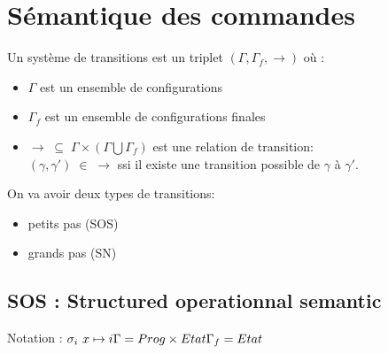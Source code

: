 \documentclass[10pt,a4paper]{article}
\begin{document}
\section{Sémantique des commandes}

\begin{definition} Un système de transitions est un triplet $(\Gamma, \Gamma_f, \rightarrow )$ où :\begin{itemize}
\item $\Gamma$ est un ensemble de configurations
\item $\Gamma_f$ est un ensemble de configurations finales
\item $\rightarrow \; \subseteq \; \Gamma \times (\Gamma \bigcup \Gamma_f )$ est une relation de transition: \\
$(\gamma, \gamma' )\; \in \;\rightarrow$ ssi il existe une transition possible de $\gamma$ à $\gamma'$.
\end{itemize}
\end{definition}

On va avoir deux types de transitions: \begin{itemize}
\item petits pas (SOS)
\item grands pas (SN)
\end{itemize}

\subsection{SOS : Structured operationnal semantic}
\noindent Notation : $\sigma_i ~ x \mapsto i\\
\Gamma = Prog \times Etat\\
\Gamma_f = Etat$
\end{document}
